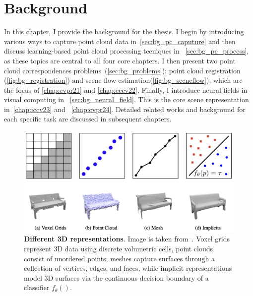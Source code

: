 \chapter{Background}
\label{chap:background}

In this chapter, I provide the background for the thesis. I begin by introducing various ways to capture point cloud data in~\cref{sec:bg_pc_caputure} and then discuss learning-based point cloud processing tecniques in ~\cref{sec:bg_pc_process}, as these topics are central to all four core chapters. I then present two point cloud correspondences problems~(\cref{sec:bg_problems}): point cloud registration (\cref{fig:bg_registration}) and scene flow estimation(\cref{fig:bg_sceneflow}), which are the focus of \cref{chap:cvpr21} and \cref{chap:eccv22}. Finally, I introduce neural fields in visual computing in ~\cref{sec:bg_neural_field}. This is the core scene representation in~\cref{chap:iccv23} and ~\cref{chap:cvpr24}. Detailed related works and background for each specific task are discussed in subsequent chapters.




\begin{figure}[t]
    \centering
    \includegraphics[width=1.0\columnwidth]{imgs/3d_representation.png}
    \caption{\textbf{Different 3D representations}. Image is taken from~\cite{mescheder2019occupancy}. Voxel grids represent 3D data using discrete volumetric cells, point clouds consist of unordered points, meshes capture surfaces through a collection of vertices, edges, and faces, while implicit representations model 3D surfaces via the continuous decision boundary of a classifier $f_{\theta}()$.}
    \label{fig:3d_representation}
\end{figure}

